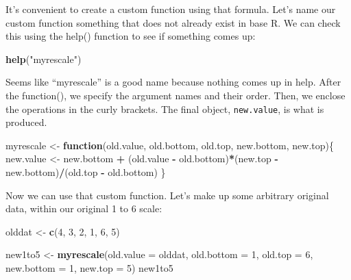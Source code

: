 \documentclass[
]{article}
\newenvironment{Shaded}{\begin{snugshade}}{\end{snugshade}}
\newcommand{\ControlFlowTok}[1]{\textcolor[rgb]{0.13,0.29,0.53}{\textbf{#1}}}
\newcommand{\DataTypeTok}[1]{\textcolor[rgb]{0.13,0.29,0.53}{#1}}
\newcommand{\DecValTok}[1]{\textcolor[rgb]{0.00,0.00,0.81}{#1}}
\newcommand{\KeywordTok}[1]{\textcolor[rgb]{0.13,0.29,0.53}{\textbf{#1}}}
\newcommand{\NormalTok}[1]{#1}
\newcommand{\OperatorTok}[1]{\textcolor[rgb]{0.81,0.36,0.00}{\textbf{#1}}}
\newcommand{\StringTok}[1]{\textcolor[rgb]{0.31,0.60,0.02}{#1}}
\begin{document}
It's convenient to create a custom function using that formula. Let's name our custom function something that does not already exist in base R. We can check this using the help() function to see if something comes up:

\begin{Shaded}
\begin{Highlighting}[]
\KeywordTok{help}\NormalTok{(}\StringTok{"myrescale"}\NormalTok{) }
\end{Highlighting}
\end{Shaded}

Seems like ``myrescale'' is a good name because nothing comes up in help. After the function(), we specify the argument names and their order. Then, we enclose the operations in the curly brackets. The final object, \texttt{new.value}, is what is produced.

\begin{Shaded}
\begin{Highlighting}[]
\NormalTok{myrescale <-}\StringTok{ }\ControlFlowTok{function}\NormalTok{(old.value, old.bottom, old.top, new.bottom, new.top)\{}
\NormalTok{ new.value <-}\StringTok{ }\NormalTok{new.bottom }\OperatorTok{+}\StringTok{ }\NormalTok{(old.value }\OperatorTok{-}\StringTok{ }\NormalTok{old.bottom)}\OperatorTok{*}\NormalTok{(new.top }\OperatorTok{-}\StringTok{ }\NormalTok{new.bottom)}\OperatorTok{/}\NormalTok{(old.top }\OperatorTok{-}\StringTok{ }\NormalTok{old.bottom)}
\NormalTok{\}}
\end{Highlighting}
\end{Shaded}

Now we can use that custom function. Let's make up some arbitrary original data,
within our original 1 to 6 scale:

\begin{Shaded}
\begin{Highlighting}[]
\NormalTok{olddat <-}\StringTok{ }\KeywordTok{c}\NormalTok{(}\DecValTok{4}\NormalTok{, }\DecValTok{3}\NormalTok{, }\DecValTok{2}\NormalTok{, }\DecValTok{1}\NormalTok{, }\DecValTok{6}\NormalTok{, }\DecValTok{5}\NormalTok{)}

\NormalTok{new1to5 <-}\StringTok{ }\KeywordTok{myrescale}\NormalTok{(}\DataTypeTok{old.value  =}\NormalTok{ olddat, }
                     \DataTypeTok{old.bottom =} \DecValTok{1}\NormalTok{, }
                     \DataTypeTok{old.top    =} \DecValTok{6}\NormalTok{, }
                     \DataTypeTok{new.bottom =} \DecValTok{1}\NormalTok{, }
                     \DataTypeTok{new.top    =} \DecValTok{5}\NormalTok{)}
\NormalTok{new1to5}
\end{Highlighting}
\end{Shaded}
\end{document}

